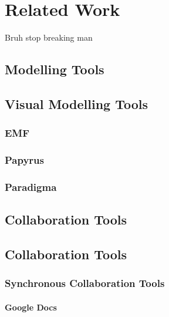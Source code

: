 
%

\chapter{Related Work}
\label{cha:related_work}

Bruh stop breaking man

\section{Modelling Tools}

\section{Visual Modelling Tools}
\label{sec:visual_modelling_tools}

\subsection{EMF}
\subsection{Papyrus}
\subsection{Paradigma}

\section{Collaboration Tools}

\section{Collaboration Tools}

\subsection{Synchronous Collaboration Tools}
\subsubsection{Google Docs}
